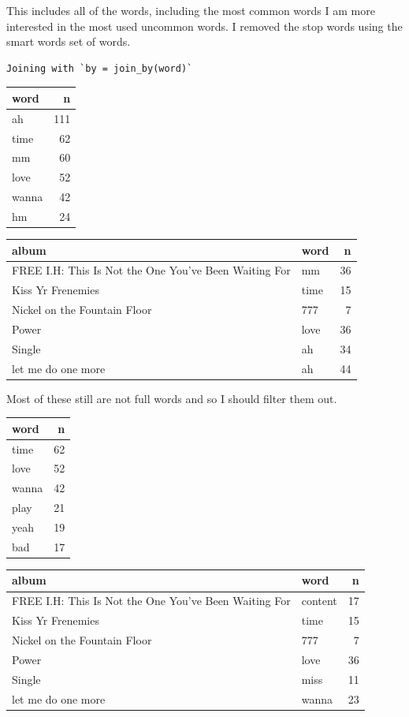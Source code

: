 \documentclass[
  letterpaper,
  DIV=11,
  numbers=noendperiod]{scrartcl}
\begin{document}
This includes all of the words, including the most common words I am
more interested in the most used uncommon words. I removed the stop
words using the smart words set of words.

\begin{verbatim}
Joining with `by = join_by(word)`
\end{verbatim}

\begin{longtable}[]{@{}lr@{}}
\toprule\noalign{}
word & n \\
\midrule\noalign{}
\endhead
\bottomrule\noalign{}
\endlastfoot
ah & 111 \\
time & 62 \\
mm & 60 \\
love & 52 \\
wanna & 42 \\
hm & 24 \\
\end{longtable}

\begin{longtable}[]{@{}llr@{}}
\toprule\noalign{}
album & word & n \\
\midrule\noalign{}
\endhead
\bottomrule\noalign{}
\endlastfoot
FREE I.H: This Is Not the One You've Been Waiting For & mm & 36 \\
Kiss Yr Frenemies & time & 15 \\
Nickel on the Fountain Floor & 777 & 7 \\
Power & love & 36 \\
Single & ah & 34 \\
let me do one more & ah & 44 \\
\end{longtable}

Most of these still are not full words and so I should filter them out.

\begin{longtable}[]{@{}lr@{}}
\toprule\noalign{}
word & n \\
\midrule\noalign{}
\endhead
\bottomrule\noalign{}
\endlastfoot
time & 62 \\
love & 52 \\
wanna & 42 \\
play & 21 \\
yeah & 19 \\
bad & 17 \\
\end{longtable}

\begin{longtable}[]{@{}llr@{}}
\toprule\noalign{}
album & word & n \\
\midrule\noalign{}
\endhead
\bottomrule\noalign{}
\endlastfoot
FREE I.H: This Is Not the One You've Been Waiting For & content & 17 \\
Kiss Yr Frenemies & time & 15 \\
Nickel on the Fountain Floor & 777 & 7 \\
Power & love & 36 \\
Single & miss & 11 \\
let me do one more & wanna & 23 \\
\end{longtable}
\end{document}
